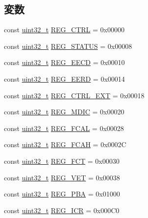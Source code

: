 \subsection*{変数}
\begin{DoxyCompactItemize}
\item 
const \hyperlink{Type_8hh_a435d1572bf3f880d55459d9805097f62}{uint32\_\-t} \hyperlink{namespaceiGbReg_a20020599b1b178310f589aad60b95d78}{REG\_\-CTRL} = 0x00000
\item 
const \hyperlink{Type_8hh_a435d1572bf3f880d55459d9805097f62}{uint32\_\-t} \hyperlink{namespaceiGbReg_ac1d1c17e03a8c10f26a1f4a2b2f2e8db}{REG\_\-STATUS} = 0x00008
\item 
const \hyperlink{Type_8hh_a435d1572bf3f880d55459d9805097f62}{uint32\_\-t} \hyperlink{namespaceiGbReg_af673fadbe51cbe2b7e87961c48ef5180}{REG\_\-EECD} = 0x00010
\item 
const \hyperlink{Type_8hh_a435d1572bf3f880d55459d9805097f62}{uint32\_\-t} \hyperlink{namespaceiGbReg_a5dcdf9f0dc751450a4395fbd2657cd7f}{REG\_\-EERD} = 0x00014
\item 
const \hyperlink{Type_8hh_a435d1572bf3f880d55459d9805097f62}{uint32\_\-t} \hyperlink{namespaceiGbReg_aee737b7c1f7c88ebd5f043dd77266f7b}{REG\_\-CTRL\_\-EXT} = 0x00018
\item 
const \hyperlink{Type_8hh_a435d1572bf3f880d55459d9805097f62}{uint32\_\-t} \hyperlink{namespaceiGbReg_af363a2b7433ba64df839c6a45beb0e05}{REG\_\-MDIC} = 0x00020
\item 
const \hyperlink{Type_8hh_a435d1572bf3f880d55459d9805097f62}{uint32\_\-t} \hyperlink{namespaceiGbReg_a8a594fcc2df76c0809c21dcb8c2968e4}{REG\_\-FCAL} = 0x00028
\item 
const \hyperlink{Type_8hh_a435d1572bf3f880d55459d9805097f62}{uint32\_\-t} \hyperlink{namespaceiGbReg_a27cbb3863547fdf28582267066bb6f8f}{REG\_\-FCAH} = 0x0002C
\item 
const \hyperlink{Type_8hh_a435d1572bf3f880d55459d9805097f62}{uint32\_\-t} \hyperlink{namespaceiGbReg_ab74980c02376c3fb79873d6bc34a15df}{REG\_\-FCT} = 0x00030
\item 
const \hyperlink{Type_8hh_a435d1572bf3f880d55459d9805097f62}{uint32\_\-t} \hyperlink{namespaceiGbReg_a1fa2f6b31ba0905012d75a5941a64966}{REG\_\-VET} = 0x00038
\item 
const \hyperlink{Type_8hh_a435d1572bf3f880d55459d9805097f62}{uint32\_\-t} \hyperlink{namespaceiGbReg_a095339ea1d33453b7754d407c6e6550c}{REG\_\-PBA} = 0x01000
\item 
const \hyperlink{Type_8hh_a435d1572bf3f880d55459d9805097f62}{uint32\_\-t} \hyperlink{namespaceiGbReg_a24c53e651278cac8ad2d31eb921e4879}{REG\_\-ICR} = 0x000C0

\end{DoxyCompactItemize}
